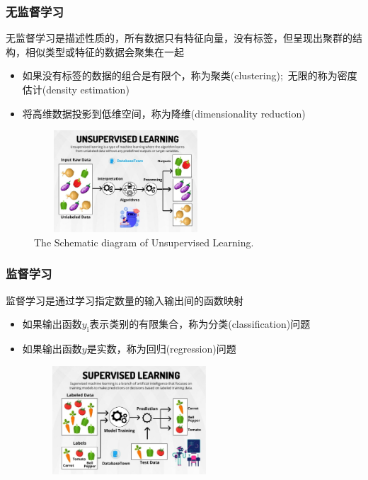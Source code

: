 {{\frame
{
	\frametitle{无监督学习}
无监督学习是描述性质的，所有数据只有特征向量，没有标签，但呈现出聚群的结构，相似类型或特征的数据会聚集在一起
\begin{itemize}
	\item 如果没有标签的数据的组合是有限个，称为聚类\textrm{(clustering)};~无限的称为密度估计\textrm{(density estimation)}
	\item 将高维数据投影到低维空间，称为降维\textrm{(dimensionality reduction)}
		\vskip 2pt
		{\fontsize{8.0pt}{4.2pt}\selectfont{降维有助于了解复杂数数据的检测模式}}
\end{itemize}
\begin{figure}[h!]
\centering
\vspace*{-0.1in}
\includegraphics[height=1.5in,width=2.7in,viewport=0 0 1075 720,clip]{Figures/ML_Unsupervised-Learning.jpg}
\caption{\tiny{\textrm{The Schematic diagram of Unsupervised Learning.}}}%
\label{ML_Unsupervised-Learning}
\end{figure}
}

\frame
{
	\frametitle{监督学习}
	监督学习是通过学习指定数量的输入输出间的函数映射
\begin{itemize}
	\item 如果输出函数$y_{\mathrm{i}}$表示类别的有限集合，称为分类\textrm{(classification)}问题
		\vskip 2pt
		{\fontsize{8.0pt}{4.2pt}\selectfont{模型可用来预测未知数据所属类型}}
	\item 如果输出函数$y$是实数，称为回归\textrm{(regression)}问题
		\vskip 2pt
		{\fontsize{8.0pt}{4.2pt}\selectfont{模型可用来预测未知输入数据对应的值输出值}}
\end{itemize}
\begin{figure}[h!]
\centering
\vspace*{-0.1in}
\includegraphics[height=1.6in,width=2.8in,viewport=0 0 1075 720,clip]{Figures/ML_Supervised-Learning-2.jpg}
\caption{\tiny{}}%
\label{ML_Supervised-Learning}
\end{figure}
}

}}
